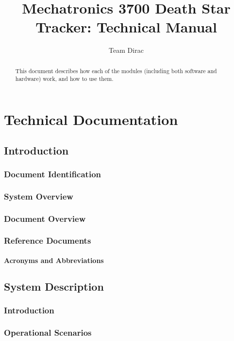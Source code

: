 \documentclass[10pt,a4paper]{report}
\author{Team Dirac}
\title{Mechatronics 3700 Death Star Tracker: Technical Manual}
\begin{document}
\maketitle

\begin{abstract}
	This document describes how each of the modules (including both software and hardware) work, and how to use them.
\end{abstract}

\part{Technical Documentation}
\chapter{Introduction}
\section{Document Identification}

\section{System Overview}

\section{Document Overview}

\section{Reference Documents}

\subsection{Acronyms and Abbreviations}

\chapter{System Description}
\section{Introduction}

\section{Operational Scenarios}
\end{document}
